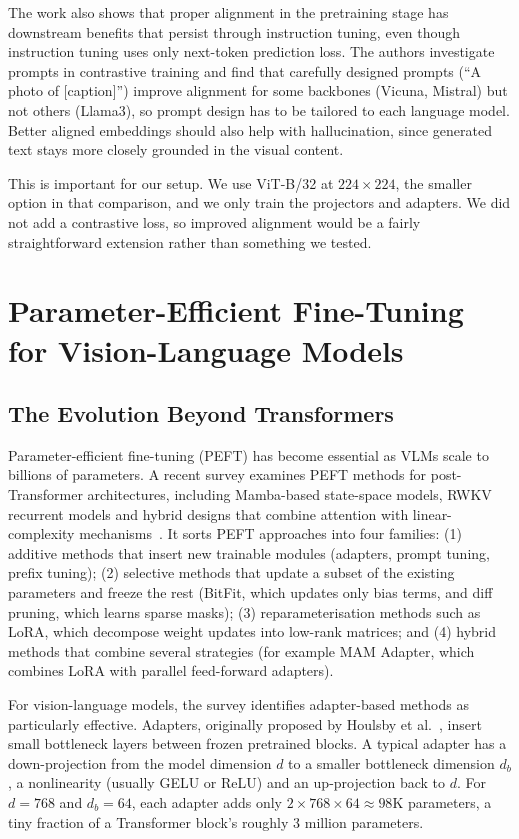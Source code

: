 \documentclass[12pt]{report}
\begin{document}
The work also shows that proper alignment in the pretraining stage has downstream benefits that persist through instruction tuning, even though instruction tuning uses only next-token prediction loss. The authors investigate prompts in contrastive training and find that carefully designed prompts (``A photo of [caption]'') improve alignment for some backbones (Vicuna, Mistral) but not others (Llama3), so prompt design has to be tailored to each language model. Better aligned embeddings should also help with hallucination, since generated text stays more closely grounded in the visual content.

This is important for our setup. We use ViT-B/32 at $224\times224$, the smaller option in that comparison, and we only train the projectors and adapters. We did not add a contrastive loss, so improved alignment would be a fairly straightforward extension rather than something we tested.

\section{Parameter-Efficient Fine-Tuning for Vision-Language Models}

\subsection{The Evolution Beyond Transformers}
Parameter-efficient fine-tuning (PEFT) has become essential as VLMs scale to billions of parameters. A recent survey examines PEFT methods for post-Transformer architectures, including Mamba-based state-space models, RWKV recurrent models and hybrid designs that combine attention with linear-complexity mechanisms~\cite{peft2024survey}. It sorts PEFT approaches into four families: (1) additive methods that insert new trainable modules (adapters, prompt tuning, prefix tuning); (2) selective methods that update a subset of the existing parameters and freeze the rest (BitFit, which updates only bias terms, and diff pruning, which learns sparse masks); (3) reparameterisation methods such as LoRA, which decompose weight updates into low-rank matrices; and (4) hybrid methods that combine several strategies (for example MAM Adapter, which combines LoRA with parallel feed-forward adapters).

For vision-language models, the survey identifies adapter-based methods as particularly effective. Adapters, originally proposed by Houlsby et al.~\cite{houlsby2019}, insert small bottleneck layers between frozen pretrained blocks. A typical adapter has a down-projection from the model dimension $d$ to a smaller bottleneck dimension $d_b$, a nonlinearity (usually GELU or ReLU) and an up-projection back to $d$. For $d=768$ and $d_b=64$, each adapter adds only $2 \times 768 \times 64 \approx 98$K parameters, a tiny fraction of a Transformer block's roughly 3 million parameters.
\end{document}
